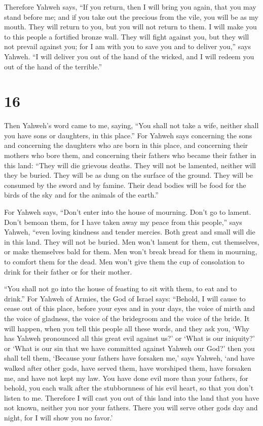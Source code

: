  Therefore Yahweh says, ``If you return, then I will bring
you again, that you may stand before me; and if you take out the
precious from the vile, you will be as my mouth. They will return to
you, but you will not return to them.  I will make you to
this people a fortified bronze wall. They will fight against you, but
they will not prevail against you; for I am with you to save you and to
deliver you,'' says Yahweh.  ``I will deliver you out of
the hand of the wicked, and I will redeem you out of the hand of the
terrible.''

\hypertarget{section-15}{%
\section{16}\label{section-15}}

 Then Yahweh's word came to me, saying,  ``You
shall not take a wife, neither shall you have sons or daughters, in this
place.''  For Yahweh says concerning the sons and concerning
the daughters who are born in this place, and concerning their mothers
who bore them, and concerning their fathers who became their father in
this land:  ``They will die grievous deaths. They will not
be lamented, neither will they be buried. They will be as dung on the
surface of the ground. They will be consumed by the sword and by famine.
Their dead bodies will be food for the birds of the sky and for the
animals of the earth.''

 For Yahweh says, ``Don't enter into the house of mourning.
Don't go to lament. Don't bemoan them, for I have taken away my peace
from this people,'' says Yahweh, ``even loving kindness and tender
mercies.  Both great and small will die in this land. They
will not be buried. Men won't lament for them, cut themselves, or make
themselves bald for them.  Men won't break bread for them in
mourning, to comfort them for the dead. Men won't give them the cup of
consolation to drink for their father or for their mother.

 ``You shall not go into the house of feasting to sit with
them, to eat and to drink.''  For Yahweh of Armies, the God
of Israel says: ``Behold, I will cause to cease out of this place,
before your eyes and in your days, the voice of mirth and the voice of
gladness, the voice of the bridegroom and the voice of the bride.
 It will happen, when you tell this people all these words,
and they ask you, `Why has Yahweh pronounced all this great evil against
us?' or `What is our iniquity?' or `What is our sin that we have
committed against Yahweh our God?'  then you shall tell
them, `Because your fathers have forsaken me,' says Yahweh, `and have
walked after other gods, have served them, have worshiped them, have
forsaken me, and have not kept my law.  You have done evil
more than your fathers, for behold, you each walk after the stubbornness
of his evil heart, so that you don't listen to me. 
Therefore I will cast you out of this land into the land that you have
not known, neither you nor your fathers. There you will serve other gods
day and night, for I will show you no favor.'

